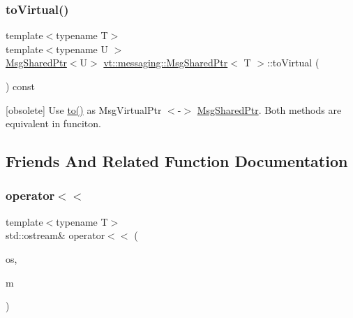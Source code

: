 \subsubsection{\texorpdfstring{to\+Virtual()}{toVirtual()}}
{\footnotesize\ttfamily template$<$typename T$>$ \\
template$<$typename U $>$ \\
\hyperlink{structvt_1_1messaging_1_1_msg_shared_ptr}{Msg\+Shared\+Ptr}$<$U$>$ \hyperlink{structvt_1_1messaging_1_1_msg_shared_ptr}{vt\+::messaging\+::\+Msg\+Shared\+Ptr}$<$ T $>$\+::to\+Virtual (\begin{DoxyParamCaption}{ }\end{DoxyParamCaption}) const\hspace{0.3cm}{\ttfamily [inline]}}

\mbox{[}obsolete\mbox{]} Use \hyperlink{structvt_1_1messaging_1_1_msg_shared_ptr_ae3d838b37f94f5f63ffc433518d46ada}{to()} as Msg\+Virtual\+Ptr $<$-\/$>$ \hyperlink{structvt_1_1messaging_1_1_msg_shared_ptr}{Msg\+Shared\+Ptr}. Both methods are equivalent in funciton. 

\subsection{Friends And Related Function Documentation}
\mbox{\label{structvt_1_1messaging_1_1_msg_shared_ptr_ac412f09ec806f5915ea4a94f3e84d5f4}} 
\subsubsection{\texorpdfstring{operator$<$$<$}{operator<<}}
{\footnotesize\ttfamily template$<$typename T$>$ \\
std\+::ostream\& operator$<$$<$ (\begin{DoxyParamCaption}\item[{std\+::ostream \&}]{os,  }\item[{\hyperlink{structvt_1_1messaging_1_1_msg_shared_ptr}{Msg\+Shared\+Ptr}$<$ T $>$ const \&}]{m }\end{DoxyParamCaption})\hspace{0.3cm}{\ttfamily [friend]}}



